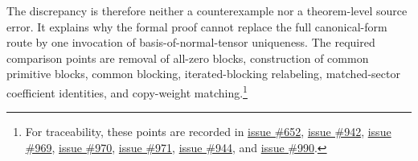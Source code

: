\documentclass{article}
\begin{document}
The discrepancy is therefore neither a counterexample nor a theorem-level
source error. It explains why the formal proof cannot replace the full
canonical-form route by one invocation of basis-of-normal-tensor uniqueness.
The required comparison points are removal of all-zero blocks, construction of
common primitive blocks, common blocking, iterated-blocking relabeling,
matched-sector coefficient identities, and copy-weight matching.\footnote{For
traceability, these points are recorded in
\href{https://github.com/LionSR/TNLean/issues/652}{issue \#652},
\href{https://github.com/LionSR/TNLean/issues/942}{issue \#942},
\href{https://github.com/LionSR/TNLean/issues/969}{issue \#969},
\href{https://github.com/LionSR/TNLean/issues/970}{issue \#970},
\href{https://github.com/LionSR/TNLean/issues/971}{issue \#971},
\href{https://github.com/LionSR/TNLean/issues/944}{issue \#944}, and
\href{https://github.com/LionSR/TNLean/issues/990}{issue \#990}.}



\end{document}

